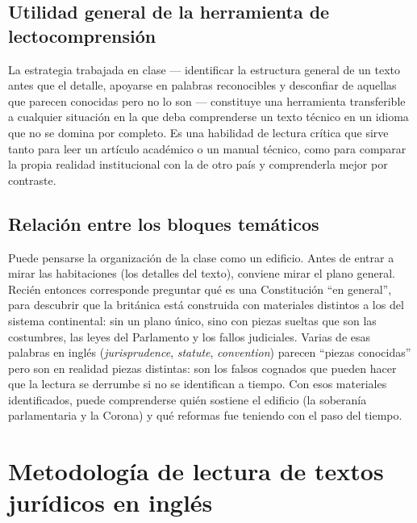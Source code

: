 \documentclass[12pt,oneside]{book}
\begin{document}
\section{Utilidad general de la herramienta de lectocomprensión}

\begin{note}
La estrategia trabajada en clase --- identificar la estructura general de un texto antes que el detalle, apoyarse en palabras reconocibles y desconfiar de aquellas que parecen conocidas pero no lo son --- constituye una herramienta transferible a cualquier situación en la que deba comprenderse un texto técnico en un idioma que no se domina por completo. Es una habilidad de lectura crítica que sirve tanto para leer un artículo académico o un manual técnico, como para comparar la propia realidad institucional con la de otro país y comprenderla mejor por contraste.
\end{note}

\section{Relación entre los bloques temáticos}

\begin{note}
Puede pensarse la organización de la clase como un edificio. Antes de entrar a mirar las habitaciones (los detalles del texto), conviene mirar el plano general. Recién entonces corresponde preguntar qué es una Constitución ``en general'', para descubrir que la británica está construida con materiales distintos a los del sistema continental: sin un plano único, sino con piezas sueltas que son las costumbres, las leyes del Parlamento y los fallos judiciales. Varias de esas palabras en inglés (\emph{jurisprudence}, \emph{statute}, \emph{convention}) parecen ``piezas conocidas'' pero son en realidad piezas distintas: son los falsos cognados que pueden hacer que la lectura se derrumbe si no se identifican a tiempo. Con esos materiales identificados, puede comprenderse quién sostiene el edificio (la soberanía parlamentaria y la Corona) y qué reformas fue teniendo con el paso del tiempo.
\end{note}

\chapter{Metodología de lectura de textos jurídicos en inglés}
\end{document}
